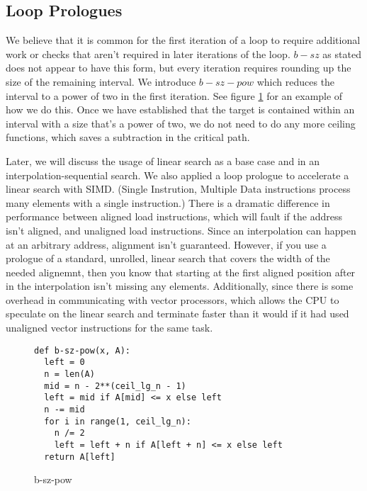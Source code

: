 \documentclass[twocolumn]{article}
\begin{document}
\subsection{Loop Prologues}
\label{prologues}
We believe that it is common for the first iteration of a loop to require additional work or checks that aren't required in later iterations of the loop. $b-sz$ as stated does not appear to have this form, but every iteration requires rounding up the size of the remaining interval. We introduce $b-sz-pow$ which reduces the interval to a power of two in the first iteration. See figure \ref{b-sz-pow} for an example of how we do this. Once we have established that the target is contained within an interval with a size that's a power of two, we do not need to do any more ceiling functions, which saves a subtraction in the critical path.

Later, we will discuss the usage of linear search as a base case and in an interpolation-sequential search. We also applied a loop prologue to accelerate a linear search with SIMD. (Single Instrution, Multiple Data instructions process many elements with a single instruction.) There is a dramatic difference in performance between aligned load instructions, which will fault if the address isn't aligned, and unaligned load instructions. Since an interpolation can happen at an arbitrary address, alignment isn't guaranteed. However, if you use a prologue of a standard, unrolled, linear search that covers the width of the needed alignemnt, then you know that starting at the first aligned position after in the interpolation isn't missing any elements. Additionally, since there is some overhead in communicating with vector processors, which allows the CPU to speculate on the linear search and terminate faster than it would if it had used unaligned vector instructions for the same task. 

\begin{figure}[ht]
\begin{verbatim}
def b-sz-pow(x, A):
  left = 0
  n = len(A)
  mid = n - 2**(ceil_lg_n - 1)
  left = mid if A[mid] <= x else left
  n -= mid
  for i in range(1, ceil_lg_n):
    n /= 2
    left = left + n if A[left + n] <= x else left
  return A[left]
\end{verbatim}
\caption{b-sz-pow}
  \label{b-sz-pow}
\end{figure}
\end{document}
